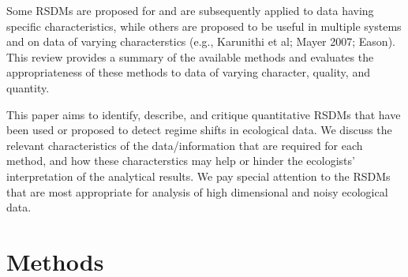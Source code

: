 \documentclass[12pt,twoside]{reedthesis}
\begin{document}
Some RSDMs are proposed for and are subsequently applied to data having
specific characteristics, while others are proposed to be useful in
multiple systems and on data of varying characterstics (e.g., Karunithi
et al; Mayer 2007; Eason). This review provides a summary of the
available methods and evaluates the appropriateness of these methods to
data of varying character, quality, and quantity.

This paper aims to identify, describe, and critique quantitative RSDMs
that have been used or proposed to detect regime shifts in ecological
data. We discuss the relevant characteristics of the data/information
that are required for each method, and how these characterstics may help
or hinder the ecologists' interpretation of the analytical results. We
pay special attention to the RSDMs that are most appropriate for
analysis of high dimensional and noisy ecological data.

\section{Methods}\label{methods}
\end{document}
